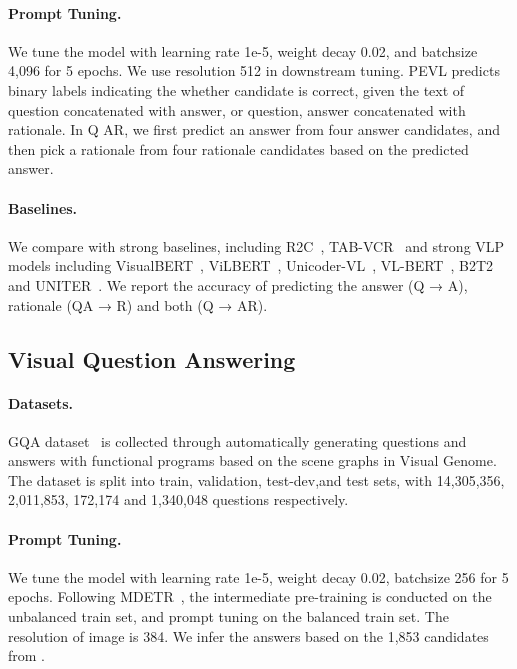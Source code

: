 \documentclass[11pt]{article}
\begin{document}
\paragraph{Prompt Tuning. } We tune the model with learning rate 1e-5, weight decay 0.02, and batchsize 4,096 for 5 epochs. We use resolution 512 in downstream tuning. PEVL predicts binary labels indicating the whether candidate is correct, given the text of question concatenated with answer, or question, answer concatenated with rationale. In Q  AR, we first predict an answer from four answer candidates, and then pick a rationale from four rationale candidates based on the predicted answer.

\paragraph{Baselines. } We compare with strong baselines, including R2C~\cite{zellers2019recognition}, TAB-VCR~\cite{LinNeurIPS2019} and strong VLP models including VisualBERT~\cite{DBLP:journals/corr/abs-1908-03557}, ViLBERT~\cite{lu2019vilbert}, Unicoder-VL~\cite{li2020unicoder}, VL-BERT~\cite{su2019vl}, B2T2~\cite{alberti2019fusion} and UNITER~\cite{chen2020uniter}. We report the accuracy of predicting the answer (Q → A), rationale (QA → R) and both (Q → AR).

\smallskip
\subsection{Visual Question Answering} 
\paragraph{Datasets.} GQA dataset~\cite{hudson2019gqa} is collected through automatically generating questions and answers with functional programs based on the scene graphs in Visual Genome. The dataset is split into train, validation, test-dev,and test sets, with 14,305,356, 2,011,853, 172,174 and 1,340,048 questions respectively.
\paragraph{Prompt Tuning. } We tune the model with learning rate 1e-5, weight decay 0.02, batchsize 256 for 5 epochs. Following  MDETR~\cite{kamath2021mdetr}, the intermediate pre-training is conducted on the unbalanced train set, and prompt tuning on the balanced train set. The resolution of image is 384. We infer the answers based on the 1,853 candidates from \citet{kamath2021mdetr}.
\end{document}
